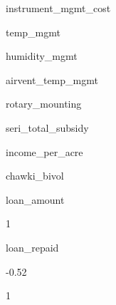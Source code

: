 \documentclass[
]{article}
\begin{document}
instrument\_mgmt\_cost

temp\_mgmt

humidity\_mgmt

airvent\_temp\_mgmt

rotary\_mounting

seri\_total\_subsidy

income\_per\_acre

chawki\_bivol

loan\_amount

{1 }

{ }

{ }

{ }

{ }

{ }

{ }

{ }

{ }

{ }

{ }

{ }

{ }

{ }

{ }

{ }

{ }

{ }

{ }

{ }

{ }

{ }

{ }

{ }

loan\_repaid

{-0.52}

{1 }

{ }

{ }

{ }

{ }

{ }

{ }

{ }

{ }

{ }

{ }

{ }

{ }

{ }

{ }

{ }

{ }

{ }

{ }

{ }
\end{document}
